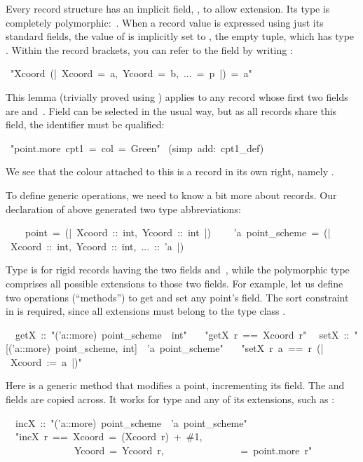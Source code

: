 Every record structure has an implicit field, , to allow
extension.  Its type is completely polymorphic:~.  When a
record value is expressed using just its standard fields, the value of
 is implicitly set to \isa{()}, the empty tuple, which has
type .  Within the record brackets, you can refer to the
 field by writing :
\begin{isabelle}
\ "Xcoord\ (|\ Xcoord\ =\ a,\ Ycoord\ =\ b,\ ...\ =\ p\ |)\ =\ a"
\end{isabelle}
This lemma (trivially proved using ) applies to any
record whose first two fields are  and~.  Field
 can be selected in the usual way, but as all records share
this field, the identifier must be qualified:
\begin{isabelle}
\ "point.more\ cpt1\ =\ \isasymlparr col\ =\ Green\isasymrparr "\isanewline
{}\ (simp\ add:\ cpt1_def)
\end{isabelle}
%
We see that the colour attached to this  is a record in its
own right, namely 
.

To define generic operations, we need to know a bit more about records.
Our declaration of  above generated two type
abbreviations:
\begin{isabelle}
\ \ \ \ point\ =\ (|\ Xcoord\ ::\ int,\ Ycoord\ ::\ int\ |)\isanewline
\ \ \ \ 'a\ point_scheme\ =\ (|\ Xcoord\ ::\ int,\ Ycoord\ ::\ int,\ ...\ ::\ 'a\ |)
\end{isabelle}
%
Type  is for rigid records having the two fields
 and~, while the polymorphic type 
comprises all possible extensions to those two fields.  For example,
let us define two operations (``methods'') to get and set any point's 
field.  The sort constraint in  is required, since
all extensions must belong to the type class .%
\begin{isabelle}
\ \ getX\ ::\ "('a::more)\ point_scheme\ \isasymRightarrow \ int"\isanewline
\ \ \ "getX\ r\ ==\ Xcoord\ r"\isanewline
\ \ setX\ ::\ "[('a::more)\ point_scheme,\ int]\ \isasymRightarrow \ 'a\ point_scheme"\isanewline
\ \ \ "setX\ r\ a\ ==\ r\ (|\ Xcoord\ :=\ a\ |)"
\end{isabelle}

Here is a generic method that modifies a point, incrementing its
 field.  The  and  fields
are copied across.  It works for type  and any of its
extensions, such as :
\begin{isabelle}
\isanewline
\ \ incX\ ::\ "('a::more)\ point_scheme\ \isasymRightarrow \ 'a\ point_scheme"\isanewline
\ \ "incX\ r\ ==\ \isasymlparr Xcoord\ =\ (Xcoord\ r)\ +\
\#1,\isanewline
\ \ \ \ \ \ \ \ \ \ \ \ \ \ Ycoord\ =\ Ycoord\ r,\isanewline
\ \ \ \ \ \ \ \ \ \ \ \ \ \ \isasymdots \ =\ point.more\
r\isasymrparr"
\end{isabelle}

